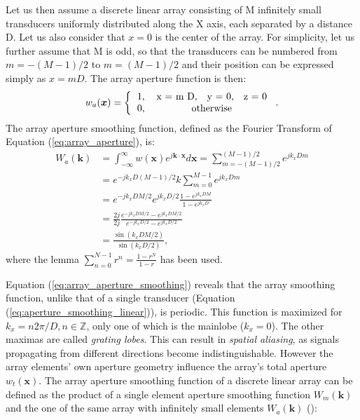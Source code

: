 Let us then assume a discrete linear array consisting of M infinitely small transducers uniformly distributed along the X axis, each separated by a distance D. Let us also consider that $x = 0$ is the center of the array. For simplicity, let us further assume that M is odd, so that the transducers can be numbered from $m = -(M-1)/2$ to $m = (M-1)/2$ and their position can be expressed simply as $x = m D$.
The array aperture function is then:
\begin{equation}
    w_a(\boldsymbol{x}) = \left \{ \begin{tabular}{cc}
        1, & x = m D, ~ y = 0, ~ z = 0 \\
        0, & otherwise
    \end{tabular}\right..
\label{eq:array_aperture}
\end{equation}
\noindent
The array aperture smoothing function, defined as the Fourier Transform of Equation (\ref{eq:array_aperture}), is:
\begin{align}
    W_a(\boldsymbol{k}) &= \int_{-\infty}^{\infty} w(\boldsymbol{x}) e^{j \boldsymbol{k} \cdot \boldsymbol{x}} d\boldsymbol{x} = \sum_{m=-(M-1)/2}^{(M-1)/2} e^{j k_x D m} \nonumber \\
    &= e^{-j k_x D (M-1)/2} k\sum_{m=0}^{M-1} e^{j k_x D m} \nonumber \\
    &= e^{-j k_x D M/2} e^{j k_x D/2} \frac{1 - e^{j k_x D M}}{1 - e^{j k_x D}} \nonumber \\
    &= \frac{2j}{2j} \frac{e^{-j k_x D M/2} - e^{j k_x D M/2}}{e^{-j k_x D/2} - e^{j k_x D/2}} \nonumber \\
    &= \frac{\sin(k_x D M/2)}{\sin(k_x D/2)},
\label{eq:array_aperture_smoothing}
\end{align}
\noindent
where the lemma $\sum_{n=0}^{N-1} r^n = \frac{1 - r^N}{1 - r}$ has been used.
\par
Equation (\ref{eq:array_aperture_smoothing}) reveals that the array smoothing function, unlike that of a single transducer (Equation (\ref{eq:aperture_smoothing_linear})), is periodic. This function is maximized for $k_x = n 2\pi/D, n \in \mathbb{Z}$, only one of which is the mainlobe ($k_x = 0$). The other maximas are called \textit{grating lobes}. This can result in \textit{spatial aliasing}, as signals propagating from different directions become indistinguishable.
However the array elements' own aperture geometry influence the array's total aperture $w_t(\boldsymbol{x})$.
The array aperture smoothing function of a discrete linear array can be defined as the product of a single element aperture smoothing function $W_m(\boldsymbol{k})$ and the one of the same array with infinitely small elements $W_a(\boldsymbol{k})$ (\cite{knut_landmark}):
